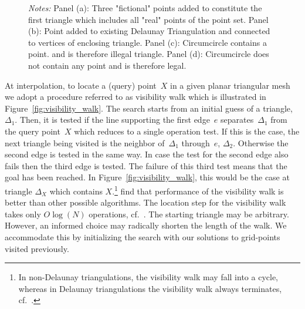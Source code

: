 \documentclass[a4paper,12pt]{article}
\begin{document}
\begin{figure}[htbp]
\begin{tabular}{cC{1cm}c}
	\end{tabular}
	\caption*{\footnotesize{\emph{Notes:} Panel (a): Three "fictional" points added to constitute the first triangle which includes all "real" points of the point set. Panel (b): Point added to existing Delaunay Triangulation and connected to vertices of enclosing triangle. Panel (c): Circumcircle contains a point. and is therefore illegal triangle. Panel (d): Circumcircle does not contain any point and is therefore legal.}}
\end{figure}

At interpolation, to locate a (query) point~$X$ in a given planar triangular mesh we adopt a procedure referred to as visibility walk which is illustrated in Figure~\ref{fig:visibility_walk}. The search starts from an initial guess of a triangle,~$\Delta_{1}$. Then, it is tested if the line supporting the first edge~$e$ separates~$\Delta_{1}$ from the query point~$X$ which reduces to a single operation test. If this is the case, the next triangle being visited is the neighbor of~$\Delta_{1}$ through~$e$, $\Delta_{2}$. Otherwise the second edge is tested in the same way. In case the test for the second edge also fails then the third edge is tested. The failure of this third test means that the goal has been reached. In Figure~\ref{fig:visibility_walk}, this would be the case at triangle $\Delta_{X}$ which contains $X$.\footnote{In non-Delaunay triangulations, the visibility walk may fall into a cycle, whereas in Delaunay triangulations the visibility walk always terminates, cf.~.}
 find that performance of the visibility walk is better than other possible algorithms. The location step for the visibility walk takes only $O\log\left(N\right)$ operations, cf.~. The starting triangle may be arbitrary. However, an informed choice may radically shorten the length of the walk. We accommodate this by initializing the search with our solutions to grid-points visited previously.
\end{document}
